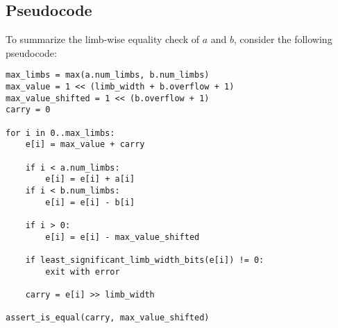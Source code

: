 \documentclass[a4paper, 12pt]{article}
\begin{document}
\subsection{Pseudocode}%
\label{sec:pseudocode}
To summarize the limb-wise equality check of $a$ and $b$, consider the following pseudocode:

\begin{verbatim}
max_limbs = max(a.num_limbs, b.num_limbs)
max_value = 1 << (limb_width + b.overflow + 1)
max_value_shifted = 1 << (b.overflow + 1)
carry = 0

for i in 0..max_limbs:
    e[i] = max_value + carry

    if i < a.num_limbs:
        e[i] = e[i] + a[i]
    if i < b.num_limbs:
        e[i] = e[i] - b[i]

    if i > 0:
        e[i] = e[i] - max_value_shifted
    
    if least_significant_limb_width_bits(e[i]) != 0:
        exit with error

    carry = e[i] >> limb_width

assert_is_equal(carry, max_value_shifted)
\end{verbatim}
\end{document}
